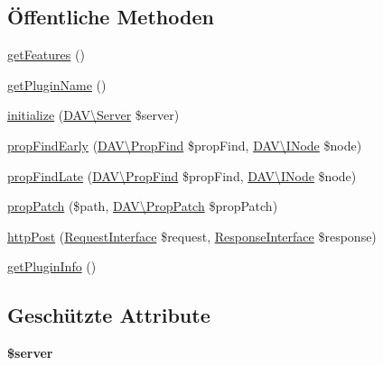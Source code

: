 \subsection*{Öffentliche Methoden}
\begin{DoxyCompactItemize}
\item 
\mbox{\hyperlink{class_sabre_1_1_cal_d_a_v_1_1_sharing_plugin_aa6f5249f65536d78fd78a900e434821d}{get\+Features}} ()
\item 
\mbox{\hyperlink{class_sabre_1_1_cal_d_a_v_1_1_sharing_plugin_ac77288e24718a4705cd9f85388528852}{get\+Plugin\+Name}} ()
\item 
\mbox{\hyperlink{class_sabre_1_1_cal_d_a_v_1_1_sharing_plugin_aac2f382d65ac97439e5d2ffdecad3866}{initialize}} (\mbox{\hyperlink{class_sabre_1_1_d_a_v_1_1_server}{D\+A\+V\textbackslash{}\+Server}} \$server)
\item 
\mbox{\hyperlink{class_sabre_1_1_cal_d_a_v_1_1_sharing_plugin_a1b9cebb0c83ae34821f5b6c4aec35ec0}{prop\+Find\+Early}} (\mbox{\hyperlink{class_sabre_1_1_d_a_v_1_1_prop_find}{D\+A\+V\textbackslash{}\+Prop\+Find}} \$prop\+Find, \mbox{\hyperlink{interface_sabre_1_1_d_a_v_1_1_i_node}{D\+A\+V\textbackslash{}\+I\+Node}} \$node)
\item 
\mbox{\hyperlink{class_sabre_1_1_cal_d_a_v_1_1_sharing_plugin_a20206c3dd48d8b548ac80a26fae3a191}{prop\+Find\+Late}} (\mbox{\hyperlink{class_sabre_1_1_d_a_v_1_1_prop_find}{D\+A\+V\textbackslash{}\+Prop\+Find}} \$prop\+Find, \mbox{\hyperlink{interface_sabre_1_1_d_a_v_1_1_i_node}{D\+A\+V\textbackslash{}\+I\+Node}} \$node)
\item 
\mbox{\hyperlink{class_sabre_1_1_cal_d_a_v_1_1_sharing_plugin_a39f5fb9a975937bafb98ca3d5da548b5}{prop\+Patch}} (\$path, \mbox{\hyperlink{class_sabre_1_1_d_a_v_1_1_prop_patch}{D\+A\+V\textbackslash{}\+Prop\+Patch}} \$prop\+Patch)
\item 
\mbox{\hyperlink{class_sabre_1_1_cal_d_a_v_1_1_sharing_plugin_a514b978319d5e5e9c787c2f8c4441fb4}{http\+Post}} (\mbox{\hyperlink{interface_sabre_1_1_h_t_t_p_1_1_request_interface}{Request\+Interface}} \$request, \mbox{\hyperlink{interface_sabre_1_1_h_t_t_p_1_1_response_interface}{Response\+Interface}} \$response)
\item 
\mbox{\hyperlink{class_sabre_1_1_cal_d_a_v_1_1_sharing_plugin_aacea1dc5415fcb7f9da345e8511df024}{get\+Plugin\+Info}} ()
\end{DoxyCompactItemize}
\subsection*{Geschützte Attribute}
\begin{DoxyCompactItemize}
\item 
\mbox{\label{class_sabre_1_1_cal_d_a_v_1_1_sharing_plugin_a49b95f9c8f8e6523a3b0ae162d1268f5}} 
{\bfseries \$server}
\end{DoxyCompactItemize}


